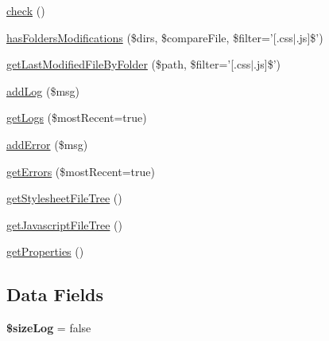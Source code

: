 \begin{DoxyCompactItemize}
\hyperlink{class_js_css_chunker_a5fb1933974ac9aae8c7ac4d3344caca6}{check} ()
\item 
\hyperlink{class_js_css_chunker_a7f9d5a7305a6eacc06d6efe724193186}{hasFoldersModifications} (\$dirs, \$compareFile, \$filter='\mbox{[}.css$|$.js\mbox{]}\$')
\item 
\hyperlink{class_js_css_chunker_aee9eb602587067c3712307deb8873dc0}{getLastModifiedFileByFolder} (\$path, \$filter='\mbox{[}.css$|$.js\mbox{]}\$')
\item 
\hyperlink{class_js_css_chunker_aa38326093bdc56769bae1e7b5bc6ae27}{addLog} (\$msg)
\item 
\hyperlink{class_js_css_chunker_ac9b0d6884469e0666b9a9c4981f7318e}{getLogs} (\$mostRecent=true)
\item 
\hyperlink{class_js_css_chunker_af6642f557316ed7df113bdf77aae3446}{addError} (\$msg)
\item 
\hyperlink{class_js_css_chunker_ab380fa3025bb07475ad8b72a58afe916}{getErrors} (\$mostRecent=true)
\item 
\hyperlink{class_js_css_chunker_a24af374e9c031780e6d9706026be5051}{getStylesheetFileTree} ()
\item 
\hyperlink{class_js_css_chunker_a61406be3290066d74f435f617cd4897b}{getJavascriptFileTree} ()
\item 
\hyperlink{class_js_css_chunker_ad92c14b6c86304d3f1fb86b2936d3408}{getProperties} ()
\end{DoxyCompactItemize}
\subsection*{Data Fields}
\begin{DoxyCompactItemize}
\item 
\hypertarget{class_js_css_chunker_a0b79a23bdabea1ec46ecb0842f0962f2}{
{\bfseries \$sizeLog} = false}
\label{class_js_css_chunker_a0b79a23bdabea1ec46ecb0842f0962f2}

\end{DoxyCompactItemize}
